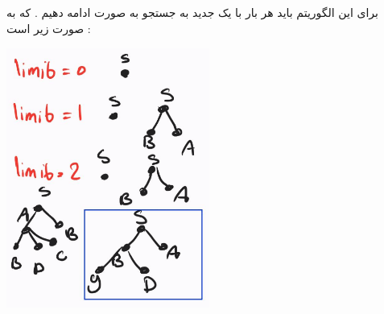 \documentclass{article}
\begin{document}
\subsection*{\textcolor{red}{}}
برای این الگوریتم باید هر بار با یک
جدید  به جستجو به صورت 
ادامه دهیم  . 
که  به صورت زیر است  : 
	\begin{center}
	\includegraphics[width=0.5\textwidth]{iddfs}
\end{center}
\end{document}
